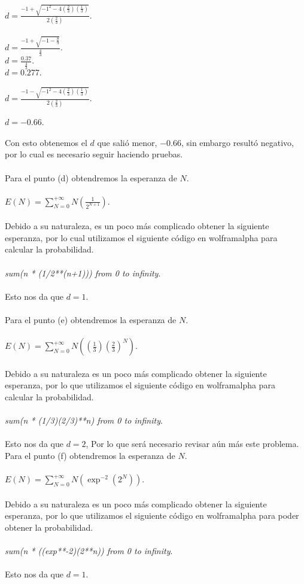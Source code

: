 \documentclass[]{article}
\begin{document}
$d = \frac{-1 + \sqrt{-1^{2} - 4(\frac{2}{3})(\frac{1}{3})}}{2(\frac{2}{3})}.$\\
\\
$d = \frac{-1 + \sqrt{-1 - \frac{8}{9}}}{\frac{4}{3}} .$\\
$d = \frac{0.37}{\frac{4}{3}} .$\\
$d = 0.277 .$\\
\\
$d = \frac{-1 - \sqrt{-1^{2} - 4(\frac{2}{3})(\frac{1}{3})}}{2(\frac{2}{3})}.$\\
\\
$d = -0.66.$\\
\\

Con esto obtenemos el $d$ que salió menor, $-0.66$, sin embargo resultó negativo, por lo cual es necesario seguir haciendo pruebas.\\
\\
Para el punto (d) obtendremos la esperanza de $N$.\\
\\
$E(N) = \sum_{N = 0}^{+\infty} N(\frac{1}{2^{N+1}})$.\\
\\
Debido a su naturaleza, es un poco más complicado obtener la siguiente esperanza, por lo cual utilizamos el siguiente código en wolframalpha para calcular la probabilidad.\\
\\
\textit{sum(n * (1/2**(n+1))) from 0 to infinity}.\\
\\
Esto nos da que $d = 1$.\\
\\
Para el punto (e) obtendremos la esperanza de $N$.\\
\\
$E(N) = \sum_{N = 0}^{+\infty} N((\frac{1}{3})(\frac{2}{3})^N)$.\\
\\
Debido a su naturaleza es un poco más complicado obtener la siguiente esperanza, por lo que utilizamos el siguiente código en wolframalpha para calcular la probabilidad.\\
\\
\textit{sum(n * (1/3)(2/3)**n) from 0 to infinity}.\\
\\
Esto nos da que $d = 2$, Por lo que será necesario revisar aún más este problema.
Para el punto (f) obtendremos la esperanza de $N$.\\
\\
$E(N) = \sum_{N = 0}^{+\infty} N(\exp^{-2}(2^N))$.\\
\\
Debido a su naturaleza es un poco más complicado obtener la siguiente esperanza, por lo que utilizamos el siguiente código en wolframalpha para poder 
obtener la probabilidad.\\
\\
\textit{sum(n * ((exp**-2)(2**n)) from 0 to infinity}.\\
\\
Esto nos da que $d = 1$.
\end{document}
